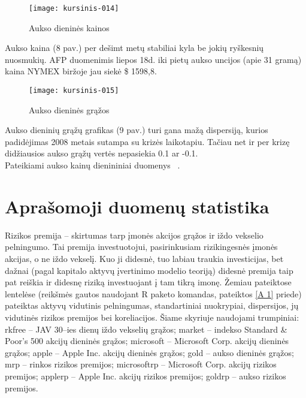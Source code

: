 \documentclass[12pt, a14paper, lithuanian]{article}
\begin{document}
\begin{figure}[H]
  \centering
\texttt{[image: kursinis-014]}
  \caption{Aukso dieninės kainos}
  \label{fig:8}
\end{figure}

Aukso kaina (8 pav.) per dešimt metų stabiliai kyla be jokių ryškesnių nuosmukių. AFP duomenimis liepos 18d. iki pietų aukso uncijos (apie 31 gramą) kaina NYMEX biržoje jau siekė \$ 1598,8.


\begin{figure}[H]
  \centering
\texttt{[image: kursinis-015]}
  \caption{Aukso dieninės grąžos}
  \label{fig:9}
\end{figure}
             
Aukso dieninių grąžų grafikas (9 pav.) turi gana mažą dispersiją, kurios padidėjimas 2008 metais 
sutampa su krizės laikotapiu. Tačiau net ir per krizę didžiausios aukso grąžų vertės nepasiekia 0.1 ar -0.1. \\

Pateikiami aukso kainų dienininiai duomenys~\cite{gold} .

\newpage
\section{Aprašomoji duomenų statistika}

Rizikos premija -- skirtumas tarp įmonės akcijos grąžos ir iždo vekselio pelningumo. Tai premija investuotojui,
pasirinkusiam rizikingesnės įmonės akcijas, o ne iždo vekselį. Kuo ji didesnė, tuo labiau
traukia investicijas, bet dažnai (pagal kapitalo aktyvų įvertinimo modelio teoriją) didesnė premija taip pat reiškia ir didesnę riziką 
investuojant į tam tikrą imonę. Žemiau pateiktose lentelėse (reikšmės gautos naudojant R paketo komandas, pateiktos \ref{A 1} priede) pateiktas aktyvų vidutinis pelningumas,
standartiniai nuokrypiai, dispersijos, jų vidutinės rizikos premijos bei koreliacijos. Šiame skyriuje naudojami trumpiniai:
rkfree -- JAV 30--ies dienų iždo vekselių grąžos;
market -- indekso Standard \& Poor's 500 akcijų dieninės grąžos;
microsoft -- Microsoft Corp. akcijų dieninės grąžos;
apple -- Apple Inc. akcijų dieninės grąžos;
gold -- aukso dieninės grąžos;
mrp -- rinkos rizikos premijos;
microsoftrp -- Microsoft Corp. akcijų rizikos premijos;
applerp -- Apple Inc. akcijų rizikos premijos;
goldrp -- aukso rizikos premijos. 
\end{document}
